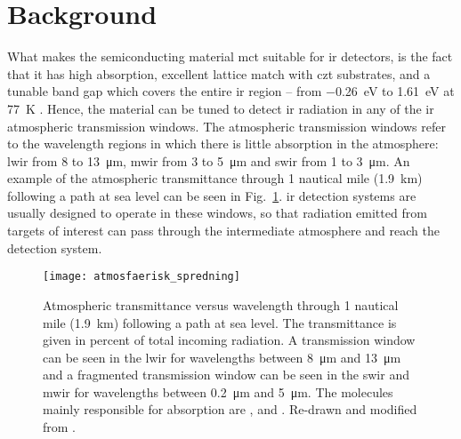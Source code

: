 \section{Background}%

What makes the semiconducting material \ac{mct} suitable for \ac{ir} detectors, is the fact that it has high absorption, excellent lattice match with \ac{czt} substrates, and a tunable band gap which covers the entire \ac{ir} region -- from \SI{-0.26}{\electronvolt} to \SI{1.61}{\electronvolt} at \SI{77}{\kelvin} \citep{hansen1982energy}. Hence, the material can be tuned to detect \ac{ir} radiation in any of the \ac{ir} atmospheric transmission windows. The atmospheric transmission windows refer to the wavelength regions in which there is little absorption in the atmosphere: \ac{lwir} from \SI{8}{} to \SI{13}{\micro\metre}, \ac{mwir} from \SI{3}{} to \SI{5}{\micro\metre} and \ac{swir} from \SI{1}{} to \SI{3}{\micro\metre}. An example of the atmospheric transmittance through 1 nautical mile (\SI{1.9}{\kilo\metre}) following a path at sea level can be seen in Fig.~\ref{fig:atm_window}. \Ac{ir} detection systems are usually designed to operate in these windows, so that radiation emitted from targets of interest can pass through the intermediate atmosphere and reach the detection system.

\begin{figure}[htbp]
    \centering
    \texttt{[image: atmosfaerisk\_spredning]}
    \caption[Atmospheric transmittance versus wavelength.]{Atmospheric transmittance versus wavelength through 1 nautical mile (\SI{1.9}{\kilo\metre}) following a path at sea level. The transmittance is given in percent of total incoming radiation. A transmission window can be seen in the \acf{lwir} for wavelengths between \SI{8}{\micro\metre} and \SI{13}{\micro\metre} and a fragmented transmission window can be seen in the \acf{swir} and \acf{mwir} for wavelengths between \SI{0.2}{\micro\metre} and \SI{5}{\micro\metre}. The molecules mainly responsible for absorption are ,  and . Re-drawn and modified from \citet{naval2013electronic}.}
    \label{fig:atm_window}
\end{figure}

